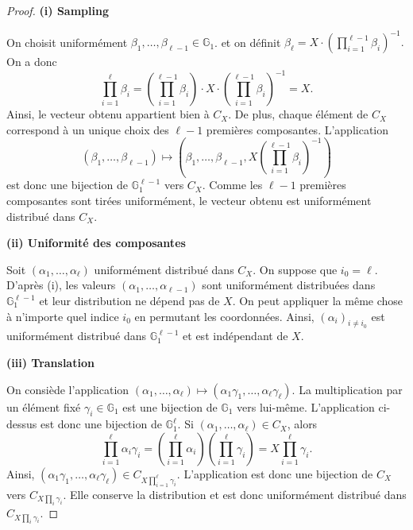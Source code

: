 \documentclass[10pt,a4paper]{article}
\theoremstyle{definition}
\theoremstyle{plain}
\theoremstyle{remark}
\begin{document}
\begin{proof}

\textbf{(i) Sampling}

On choisit uniformément
$\beta_1,\ldots,\beta_{\ell-1}\in\mathbb{G}_1$.
et on définit 
$
\beta_\ell
=
X\cdot
\left(\prod_{i=1}^{\ell-1}\beta_i\right)^{-1}.
$
On a donc
\[
\prod_{i=1}^{\ell}\beta_i
=
\left(\prod_{i=1}^{\ell-1}\beta_i\right)
\cdot
X\cdot
\left(\prod_{i=1}^{\ell-1}\beta_i\right)^{-1}
=X.
\]
Ainsi, le vecteur obtenu appartient bien à $C_X$.
De plus, chaque élément de $C_X$ correspond à un unique choix des
$\ell-1$ premières composantes.
L'application
\[
(\beta_1,\ldots,\beta_{\ell-1})
\longmapsto
\left(
\beta_1,\ldots,\beta_{\ell-1},
X\left(\prod_{i=1}^{\ell-1}\beta_i\right)^{-1}
\right)
\]
est donc une bijection de
$\mathbb{G}_1^{\ell-1}$ vers $C_X$.
Comme les $\ell-1$ premières composantes sont tirées uniformément,
le vecteur obtenu est uniformément distribué dans $C_X$.

\medskip

\textbf{(ii) Uniformité des composantes}

Soit $(\alpha_1,\ldots,\alpha_\ell)$ uniformément distribué dans
$C_X$. On suppose que $i_0=\ell$. D'après (i), les valeurs
$
(\alpha_1,\ldots,\alpha_{\ell-1})
$
sont uniformément distribuées dans
$\mathbb{G}_1^{\ell-1}$ et leur distribution ne dépend pas de $X$.
On peut appliquer la même chose à n'importe quel indice $i_0$ en
permutant les coordonnées. Ainsi,
$
(\alpha_i)_{i\neq i_0}
$
est uniformément distribué dans $\mathbb{G}_1^{\ell-1}$ et est
indépendant de $X$.

\medskip

\textbf{(iii) Translation}

On consiède l'application
$
(\alpha_1,\ldots,\alpha_\ell)
\longmapsto
(\alpha_1\gamma_1,\ldots,\alpha_\ell\gamma_\ell).
$
La multiplication par un élément fixé $\gamma_i\in\mathbb{G}_1$
est une bijection de $\mathbb{G}_1$ vers lui-même. L'application
ci-dessus est donc une bijection de $\mathbb{G}_1^\ell$.
Si $(\alpha_1,\ldots,\alpha_\ell)\in C_X$, alors
\[
\prod_{i=1}^{\ell}\alpha_i\gamma_i
=
\left(\prod_{i=1}^{\ell}\alpha_i\right)
\left(\prod_{i=1}^{\ell}\gamma_i\right)
=
X\prod_{i=1}^{\ell}\gamma_i.
\]
Ainsi,
$
(\alpha_1\gamma_1,\ldots,\alpha_\ell\gamma_\ell)
\in
C_{X\prod_{i=1}^{\ell}\gamma_i}.
$
L'application est donc une bijection de $C_X$ vers
$C_{X\prod_i\gamma_i}$.
Elle conserve la distribution et est donc uniformément distribué dans
$C_{X\prod_i\gamma_i}$.

\end{proof}
\end{document}
